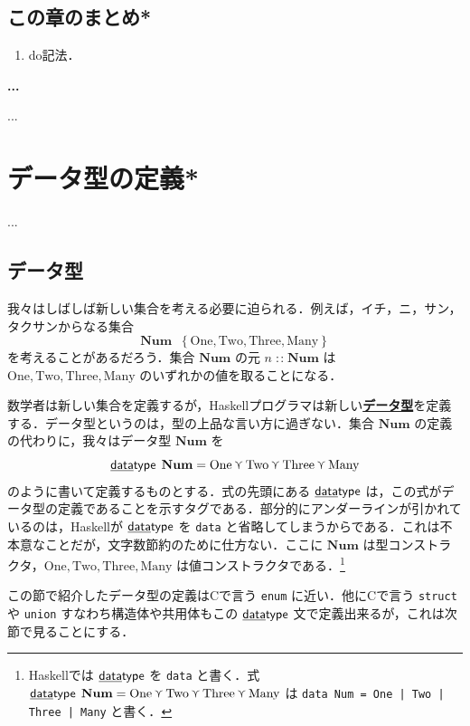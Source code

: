 \documentclass[a4paper,twocolumn]{jsbook}
\newcommand{\programminglanguage}[1]{\textsf{#1}}
\newcommand{\clang}{\programminglanguage{C}}
\newcommand{\haskell}{\programminglanguage{Haskell}}
\newenvironment{note}[1]{\begin{boxnote}\begin{center}\textbf{#1}\end{center}}{\end{boxnote}}
\newcommand{\keyword}[1]{{\underline{\textbf{#1}}}}
\newcommand{\code}[1]{\texttt{#1}}
\newcommand{\mKeyword}[1]{\mathsf{#1}} %
\newcommand{\mKeywordUnderline}[1]{\text{\underline{\textsf{#1}}}} %
\newcommand{\mDataTypeKeyword}{\mKeywordUnderline{data}\mKeyword{type}}
\DeclareMathOperator{\mDataType}{\mDataTypeKeyword}
\newcommand{\mSpecialConstant}[1]{\textrm{#1}} %
\newcommand{\mNumOne}{\mSpecialConstant{One}}
\newcommand{\mNumTwo}{\mSpecialConstant{Two}}
\newcommand{\mNumThree}{\mSpecialConstant{Three}}
\newcommand{\mNumMany}{\mSpecialConstant{Many}}
\DeclareMathOperator{\mDefEq}{\stackrel{\mathrm{def}}{=}}
\DeclareMathOperator{\mIn}{{:\!:}}
\DeclareMathOperator{\mValueOr}{\curlyvee}
\newcommand{\mSet}[1]{\mathbf{#1}}
\newcommand{\mType}[1]{\mathbf{#1}}
\newcommand{\mSetWith}[1]{\left\{#1\right\}}
\begin{document}
\section{この章のまとめ*}

\begin{enumerate}
\item do記法．
\end{enumerate}

\begin{note}{...}
...
\end{note}


\chapter{データ型の定義*}

...

\section{データ型}

我々はしばしば新しい集合を考える必要に迫られる．例えば，イチ，ニ，サン，タクサンからなる集合
\begin{equation}
\mSet{Num}\mDefEq\mSetWith{\mNumOne,\mNumTwo,\mNumThree,\mNumMany}
\end{equation}
を考えることがあるだろう．集合 $\mSet{Num}$ の元 $n\mIn\mSet{Num}$ は $\mNumOne,\mNumTwo,\mNumThree,\mNumMany$ のいずれかの値を取ることになる．

数学者は新しい集合を定義するが，\haskell プログラマは新しい\keyword{データ型}を定義する．データ型というのは，型の上品な言い方に過ぎない．集合 $\mSet{Num}$ の定義の代わりに，我々はデータ型 $\mType{Num}$ を
\begin{equation}
\mDataType\;\mType{Num}
=\mNumOne\mValueOr\mNumTwo\mValueOr\mNumThree\mValueOr\mNumMany
\end{equation}
のように書いて定義するものとする．式の先頭にある $\mDataType$ は，この式がデータ型の定義であることを示すタグである．部分的にアンダーラインが引かれているのは，\haskell が $\mDataType$ を \code{data} と省略してしまうからである．これは不本意なことだが，文字数節約のために仕方ない．ここに $\mSet{Num}$ は型コンストラクタ，$\mNumOne,\mNumTwo,\mNumThree,\mNumMany$ は値コンストラクタである．\footnote{\haskell では $\mDataType$ を \code{data} と書く．式 $\mDataType\;\mType{Num}
=\mNumOne\mValueOr\mNumTwo\mValueOr\mNumThree\mValueOr\mNumMany$ は \code{data Num = One | Two | Three | Many} と書く．}

この節で紹介したデータ型の定義は\clang で言う \code{enum} に近い．他に\clang で言う \code{struct} や \code{union} すなわち構造体や共用体もこの $\mDataType$ 文で定義出来るが，これは次節で見ることにする．
\end{document}
